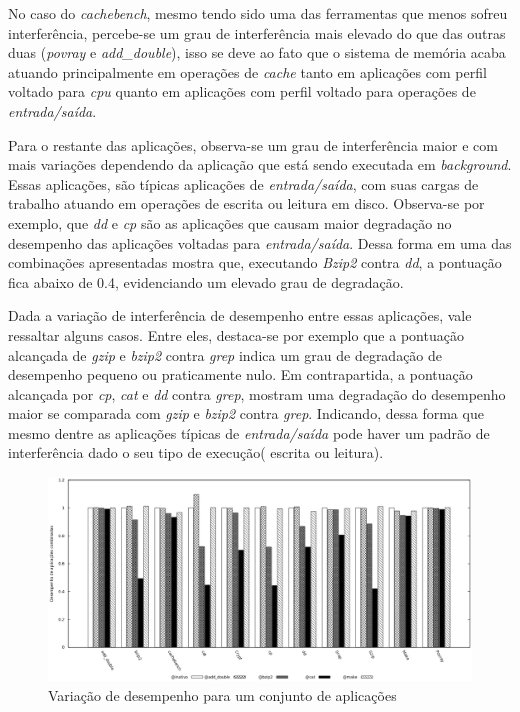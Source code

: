 No caso do \textit{cachebench}, mesmo tendo sido uma das ferramentas que menos sofreu interferência, percebe-se um grau de interferência mais elevado do que das outras duas (\textit{povray} e \textit{add\_double}), isso se deve ao fato que o sistema de memória acaba atuando principalmente em operações de \textit{cache} tanto em aplicações com perfil voltado para \textit{cpu} quanto em aplicações com perfil voltado para operações de \textit{entrada/saída}.

Para o restante das aplicações, observa-se um grau de interferência maior e com mais variações dependendo da aplicação que está sendo executada em \textit{background}. Essas aplicações, são típicas aplicações de \textit{entrada/saída}, com suas cargas de trabalho atuando em operações de escrita ou leitura em disco. Observa-se por exemplo, que \textit{dd} e \textit{cp} são as aplicações que causam maior degradação no desempenho das aplicações voltadas para \textit{entrada/saída}. Dessa forma  em uma das combinações apresentadas mostra que, executando \textit{Bzip2} contra \textit{dd}, a pontuação fica abaixo de 0.4, evidenciando um elevado grau de degradação.

Dada a variação de interferência de desempenho entre essas aplicações, vale ressaltar alguns casos. Entre eles, destaca-se por exemplo que a pontuação alcançada de \textit{gzip} e \textit{bzip2} contra \textit{grep} indica um grau de degradação de desempenho pequeno ou praticamente nulo. Em contrapartida, a pontuação alcançada por \textit{cp}, \textit{cat} e \textit{dd} contra \textit{grep}, mostram uma degradação do desempenho maior se comparada com \textit{gzip} e \textit{bzip2} contra \textit{grep}. Indicando, dessa forma que mesmo dentre as aplicações típicas de \textit{entrada/saída} pode haver um padrão de interferência dado o seu tipo de execução( escrita ou leitura). 

\begin{figure}[!h]
\centering
\includegraphics [keepaspectratio=true,scale=0.5]{graficos/exp_2_1_foreground.eps}
\caption{Variação de desempenho para um conjunto de aplicações}
\label{second_experiment_second}
\end{figure} 

